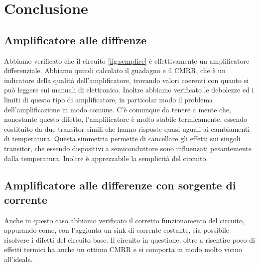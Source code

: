 \section*{Conclusione}

\subsection*{Amplificatore alle diffrenze}

Abbiamo verificato che il circuito \ref{fig:semplice} è effettivamente un amplificatore differenziale. Abbiamo quindi calcolato il guadagno e il CMRR, che è un
indicatore della qualità dell'amplificatore, trovando valori coerenti con quanto si può leggere sui manuali di elettronica. Inoltre abbiamo verificato le debolezze ed i limiti
di questo tipo di amplificatore, in particolar modo il problema dell'amplificazione in modo comune. C'è comunque da tenere a mente che, nonostante questo difetto,
l'amplificatore è molto stabile termicamente, essendo costituito da due transitor simili che hanno risposte quasi uguali ai cambiamenti di temperatura. Questa simmetria
permette di cancellare gli effetti sui singoli transitor, che essendo dispositivi a semiconduttore sono influenzati pesantemente dalla temperatura. Inoltre è apprezzabile
la semplicità del circuito.

\subsection*{Amplificatore alle differenze con sorgente di corrente}

Anche in questo caso abbiamo verificato il corretto funzionamento del circuito, appurando come, con l'aggiunta un sink di corrente costante, sia possibile
risolvere i difetti del circuito base. Il circuito in questione, oltre a risentire poco di effetti termici ha anche un ottimo CMRR e si comporta in modo molto
vicino all'ideale.
